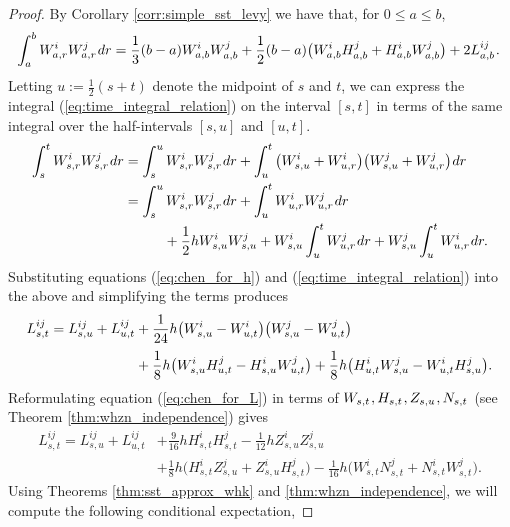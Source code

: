 \documentclass[sn-mathphys-num]{sn-jnl}%
\newcommand{\m}{\hspace{0.25mm}}
\begin{document}
\begin{proof}
By Corollary \ref{corr:simple_sst_levy} we have that, for $0\leq a\leq b$,
\begin{align}
\hspace{-0.5mm}\int_a^b W_{a,r}^i W_{a,r}^j\m dr = \frac{1}{3}(b-a) W_{a,b}^{i}W_{a,b}^{j} + \frac{1}{2}(b-a)\big(W_{a,b}^i H_{a,b}^j + H_{a,b}^i W_{a,b}^j\big) + 2L_{a,b}^{ij}\m. \label{eq:time_integral_relation}
\end{align}
Letting $u := \frac{1}{2}(s+t)$ denote the midpoint of $s$ and $t$, we can express the integral (\ref{eq:time_integral_relation}) on the interval $[s,t]$ in terms of the same integral over the half-intervals $[s,u]$ and $[u,t]$.
\begin{align}
\int_s^t W_{s,r}^i W_{s,r}^j\m dr & = \int_s^u W_{s,r}^i W_{s,r}^j\m dr  + \int_u^t \big(W_{s,u}^i + W_{u,r}^i\big)\big(W_{s,u}^j + W_{u,r}^j\big)\m dr\nonumber\\
& =  \int_s^u W_{s,r}^i W_{s,r}^j\m dr + \int_u^t W_{u,r}^i W_{u,r}^j\m dr\label{eq:time_integral_relation2}\\
&\hspace{10mm} + \frac{1}{2}h W_{s,u}^i W_{s,u}^j + W_{s,u}^i\int_u^t W_{u,r}^j\m dr + W_{s,u}^j\int_u^t W_{u,r}^i\m dr.\nonumber
\end{align}
Substituting equations (\ref{eq:chen_for_h}) and (\ref{eq:time_integral_relation}) into the above and simplifying the terms produces
\begin{align}
L_{s,t}^{ij} & = L_{s,u}^{ij} + L_{u,t}^{ij} + \frac{1}{24}h \big(W_{s,u}^i - W_{u,t}^i\big)\big(W_{s,u}^j - W_{u,t}^j\big)\label{eq:chen_for_L} \\[2pt]
&\hspace{21.5mm} + \frac{1}{8}h\big(W_{s,u}^i H_{u,t}^j - H_{s,u}^i W_{u,t}^j\big) + \frac{1}{8}h\big(H_{u,t}^i W_{s,u}^j - W_{u,t}^i H_{s,u}^j\big).\nonumber
\end{align}
Reformulating equation (\ref{eq:chen_for_L}) in terms of $W_{s,t}\m, H_{s,t}\m, Z_{s,u}\m, N_{s,t}\m$ (see Theorem \ref{thm:whzn_independence}) gives
\begin{align}
L_{s,t}^{ij} = L_{s,u}^{ij} + L_{u,t}^{ij} & + \frac{9}{16}h H_{s,t}^i H_{s,t}^j - \frac{1}{12}h Z_{s,u}^i Z_{s,u}^j\label{eq:better_chen_for_L}\\[2pt]
& + \frac{1}{8}h\big(H_{s,t}^i Z_{s,u}^j + Z_{s,u}^i H_{s,t}^j\big) - \frac{1}{16} h\big(W_{s,t}^i N_{s,t}^j + N_{s,t}^i W_{s,t}^j\big).\nonumber
\end{align}
Using Theorems \ref{thm:sst_approx_whk} and \ref{thm:whzn_independence}, we will compute the following conditional expectation,

\end{proof}
\end{document}

